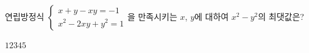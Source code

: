 연립방정식 $\begin{cases} x+y-xy=-1 \\ x^2-2xy+y^2=1 \end{cases}$을 만족시키는 $x$, $y$에 대하여 $x^2-y^2$의 최댓값은?
\begin{choices32}{$1$}{$2$}{$3$}{$4$}{$5$}\end{choices32}
